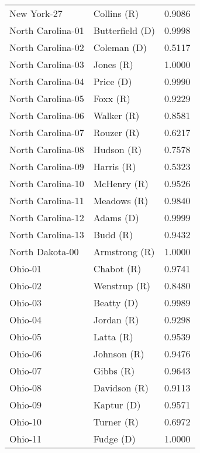 \begin{longtable}{llr}
       New York-27 &          Collins (R) &       0.9086 \\
 North Carolina-01 &      Butterfield (D) &       0.9998 \\
 North Carolina-02 &          Coleman (D) &       0.5117 \\
 North Carolina-03 &            Jones (R) &       1.0000 \\
 North Carolina-04 &            Price (D) &       0.9990 \\
 North Carolina-05 &             Foxx (R) &       0.9229 \\
 North Carolina-06 &           Walker (R) &       0.8581 \\
 North Carolina-07 &           Rouzer (R) &       0.6217 \\
 North Carolina-08 &           Hudson (R) &       0.7578 \\
 North Carolina-09 &           Harris (R) &       0.5323 \\
 North Carolina-10 &          McHenry (R) &       0.9526 \\
 North Carolina-11 &          Meadows (R) &       0.9840 \\
 North Carolina-12 &            Adams (D) &       0.9999 \\
 North Carolina-13 &             Budd (R) &       0.9432 \\
   North Dakota-00 &        Armstrong (R) &       1.0000 \\
           Ohio-01 &           Chabot (R) &       0.9741 \\
           Ohio-02 &         Wenstrup (R) &       0.8480 \\
           Ohio-03 &           Beatty (D) &       0.9989 \\
           Ohio-04 &           Jordan (R) &       0.9298 \\
           Ohio-05 &            Latta (R) &       0.9539 \\
           Ohio-06 &          Johnson (R) &       0.9476 \\
           Ohio-07 &            Gibbs (R) &       0.9643 \\
           Ohio-08 &         Davidson (R) &       0.9113 \\
           Ohio-09 &           Kaptur (D) &       0.9571 \\
           Ohio-10 &           Turner (R) &       0.6972 \\
           Ohio-11 &            Fudge (D) &       1.0000 \\

\end{longtable}
